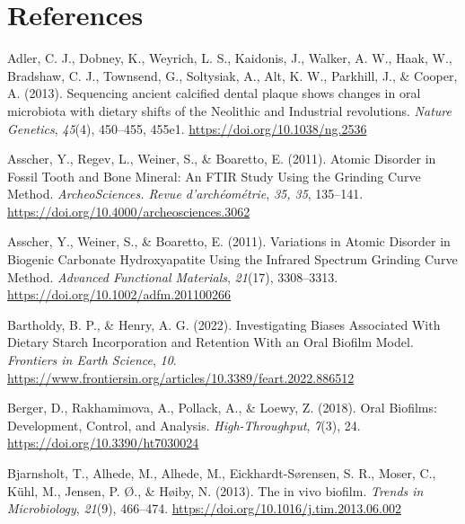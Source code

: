 \documentclass[
]{article}
\newlength{\cslhangindent}
\newlength{\cslentryspacingunit} %
\newenvironment{CSLReferences}[2] %
 {%
  \setlength{\parindent}{0pt}
  \ifodd #1
  \let\oldpar\par
  \def\par{\hangindent=\cslhangindent\oldpar}
  \fi
  \setlength{\parskip}{#2\cslentryspacingunit}
 }%
 {}
\begin{document}
\hypertarget{references}{%
\section*{References}\label{references}}

\hypertarget{refs}{}
\begin{CSLReferences}{1}{0}
\leavevmode{}%
Adler, C. J., Dobney, K., Weyrich, L. S., Kaidonis, J., Walker, A. W.,
Haak, W., Bradshaw, C. J., Townsend, G., Soltysiak, A., Alt, K. W.,
Parkhill, J., \& Cooper, A. (2013). Sequencing ancient calcified dental
plaque shows changes in oral microbiota with dietary shifts of the
{Neolithic} and {Industrial} revolutions. \emph{Nature Genetics},
\emph{45}(4), 450--455, 455e1. \url{https://doi.org/10.1038/ng.2536}

\leavevmode{}%
Asscher, Y., Regev, L., Weiner, S., \& Boaretto, E. (2011). Atomic
{Disorder} in {Fossil Tooth} and {Bone Mineral}: {An FTIR Study Using}
the {Grinding Curve Method}. \emph{ArcheoSciences. Revue
d'archéométrie}, \emph{35, 35}, 135--141.
\url{https://doi.org/10.4000/archeosciences.3062}

\leavevmode{}%
Asscher, Y., Weiner, S., \& Boaretto, E. (2011). Variations in {Atomic
Disorder} in {Biogenic Carbonate Hydroxyapatite Using} the {Infrared
Spectrum Grinding Curve Method}. \emph{Advanced Functional Materials},
\emph{21}(17), 3308--3313. \url{https://doi.org/10.1002/adfm.201100266}

\leavevmode{}%
Bartholdy, B. P., \& Henry, A. G. (2022). Investigating {Biases
Associated With Dietary Starch Incorporation} and {Retention With} an
{Oral Biofilm Model}. \emph{Frontiers in Earth Science}, \emph{10}.
\url{https://www.frontiersin.org/articles/10.3389/feart.2022.886512}

\leavevmode{}%
Berger, D., Rakhamimova, A., Pollack, A., \& Loewy, Z. (2018). Oral
{Biofilms}: {Development}, {Control}, and {Analysis}.
\emph{High-Throughput}, \emph{7}(3), 24.
\url{https://doi.org/10.3390/ht7030024}

\leavevmode{}%
Bjarnsholt, T., Alhede, M., Alhede, M., Eickhardt-Sørensen, S. R.,
Moser, C., Kühl, M., Jensen, P. Ø., \& Høiby, N. (2013). The in vivo
biofilm. \emph{Trends in Microbiology}, \emph{21}(9), 466--474.
\url{https://doi.org/10.1016/j.tim.2013.06.002}


\end{CSLReferences}
\end{document}
